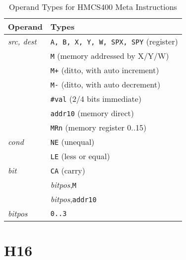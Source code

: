 \documentclass[12pt,twoside]{report}
\newcommand{\tty}[1]{{\tt #1}}
\begin{document}
\begin{table*}
\begin{center}\begin{tabular}{|l|l|}
\hline
Operand                 & Types \\
\hline
{\em src, dest}         & \tty{A, B, X, Y, W, SPX, SPY} (register) \\
                        & \tty{M} (memory addressed by X/Y/W) \\
                        & \tty{M+} (ditto, with auto increment) \\
                        & \tty{M-} (ditto, with auto decrement) \\
                        & \tty{\#val} (2/4 bits immediate) \\
                        & \tty{addr10} (memory direct) \\
                        & \tty{MRn} (memory register 0..15) \\
{\em cond}              & \tty{NE} (unequal) \\
                        & \tty{LE} (less or equal) \\
{\em bit}               & \tty{CA} (carry) \\
                        & {\em bitpos},\tty{M} \\
                        & {\em bitpos},\tty{addr10} \\
{\em bitpos}            & \tty{0..3} \\
\hline
\end{tabular}\end{center}
\caption{Operand Types for HMCS400 Meta Instructions}
\label{TabHMCS400MetaOps}
\end{table*}


\section{H16}
\end{document}

